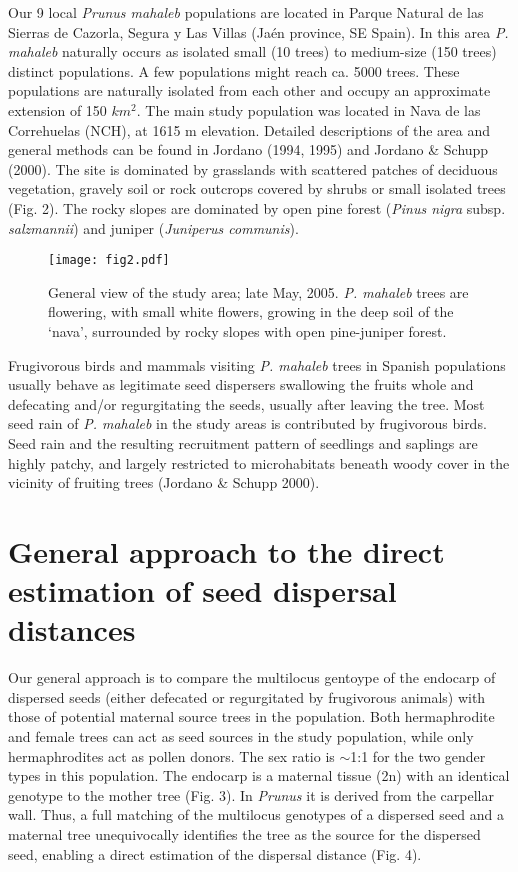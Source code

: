 \documentclass[a4paper,12pt]{article}
\newcommand{\tab}{\hspace{5mm}}
\begin{document}
\tab Our 9 local \textit{Prunus mahaleb} populations are located in Parque Natural de las Sierras de Cazorla, Segura y Las Villas (Ja\'{e}n province, SE Spain). In this area \textit{P. mahaleb} naturally occurs as isolated small (10 trees) to medium-size (150 trees) distinct populations. A few populations might reach ca. 5000 trees. These populations are naturally isolated from each other and occupy an approximate extension of 150 $km^{2}$. The main study population was located in Nava de las Correhuelas (NCH), at 1615 m elevation. Detailed descriptions of the area and general methods can be found in Jordano (1994, 1995) and Jordano \& Schupp (2000). The site is dominated by grasslands with scattered patches of deciduous vegetation, gravely soil or rock outcrops covered by shrubs or small isolated trees (Fig. 2). The rocky slopes are dominated by open pine forest (\textit{Pinus nigra} subsp. \textit{salzmannii}) and juniper (\textit{Juniperus communis}).

\begin{figure}[htbp]
\centerline{\texttt{[image: fig2.pdf]}}
%
\caption{General view of the study area; late May, 2005. \textit{P. 
mahaleb} trees are flowering, with small white flowers, growing 
in the deep soil of the `nava', surrounded by rocky slopes with 
open pine-juniper forest.}
\end{figure}

\tab Frugivorous birds and mammals visiting \textit{P. mahaleb} trees in Spanish populations usually behave as legitimate seed dispersers swallowing the fruits whole and defecating and/or regurgitating the seeds, usually after leaving the tree. Most seed rain of \textit{P. mahaleb} in the study areas is contributed by frugivorous birds. Seed rain and the resulting recruitment pattern of seedlings and saplings are highly patchy, and largely restricted to microhabitats beneath woody cover in the vicinity of fruiting trees (Jordano \& Schupp 2000).


\section{General approach to the direct estimation of seed dispersal 
distances}

\tab Our general approach is to compare the multilocus gentoype of the endocarp of dispersed seeds (either defecated or regurgitated by frugivorous animals) with those of potential maternal source trees in the population. Both hermaphrodite and female trees can act as seed sources in the study population, while only hermaphrodites act as pollen donors. The sex ratio is \ensuremath{\sim}1:1 for the two gender types in this population. The endocarp is a maternal tissue (2n) with an identical genotype to the mother tree (Fig. 3). In \textit{Prunus} it is derived from the carpellar wall. Thus, a full matching of the multilocus genotypes of a dispersed seed and a maternal tree unequivocally identifies the tree as the source for the dispersed seed, enabling a direct estimation of the dispersal distance (Fig. 4).
\end{document}
